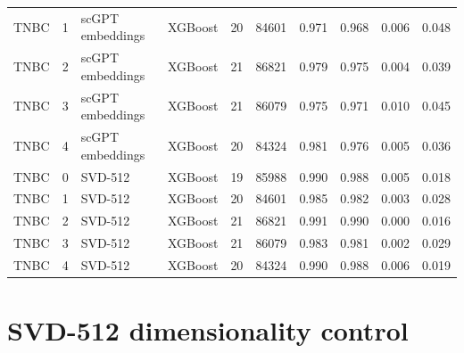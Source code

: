 {\begin{longtable}{lrllrrrrrr}
TNBC & 1 & scGPT embeddings & XGBoost & 20 & 84601 & 0.971 & 0.968 & 0.006 & 0.048 \\
TNBC & 2 & scGPT embeddings & XGBoost & 21 & 86821 & 0.979 & 0.975 & 0.004 & 0.039 \\
TNBC & 3 & scGPT embeddings & XGBoost & 21 & 86079 & 0.975 & 0.971 & 0.010 & 0.045 \\
TNBC & 4 & scGPT embeddings & XGBoost & 20 & 84324 & 0.981 & 0.976 & 0.005 & 0.036 \\
TNBC & 0 & SVD-512 & XGBoost & 19 & 85988 & 0.990 & 0.988 & 0.005 & 0.018 \\
TNBC & 1 & SVD-512 & XGBoost & 20 & 84601 & 0.985 & 0.982 & 0.003 & 0.028 \\
TNBC & 2 & SVD-512 & XGBoost & 21 & 86821 & 0.991 & 0.990 & 0.000 & 0.016 \\
TNBC & 3 & SVD-512 & XGBoost & 21 & 86079 & 0.983 & 0.981 & 0.002 & 0.029 \\
TNBC & 4 & SVD-512 & XGBoost & 20 & 84324 & 0.990 & 0.988 & 0.006 & 0.019 \\
\end{longtable}
}

\clearpage\section{SVD-512 dimensionality control}

